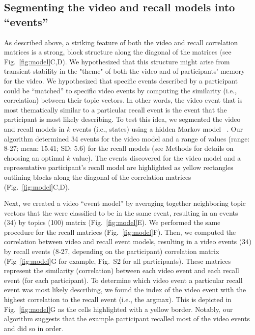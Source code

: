 \documentclass{article}
\begin{document}
\subsection*{Segmenting the video and recall models into ``events''}
As described above, a striking feature of both the video and recall correlation matrices is a strong, block structure along the diagonal of the matrices (see Fig.~\ref{fig:model}C,D).  We hypothesized that this structure might arise from transient stability in the "theme" of both the video and of participants' memory for the video. We hypothesized that specific events described by a participant could be ``matched'' to specific video events by computing the similarity (i.e., correlation) between their topic vectors. In other words, the video event that is most thematically similar to a particular recall event is the event that the participant is most likely describing. To test this idea, we segmented the video and recall models in $k$ events (i.e., states) using a hidden Markov model ~\citep{BaldEtal17}. Our algorithm determined 34 events for the video model and a range of values (range: 8-27; mean: 15.41; SD: 5.6) for the recall models (see Methods for details on choosing an optimal $k$ value).  The events discovered for the video model and a representative participant's recall model are highlighted as yellow rectangles outlining blocks along the diagonal of the correlation matrices (Fig.~\ref{fig:model}C,D).

Next, we created a video ``event model'' by averaging together neighboring topic vectors that the were classified to be in the same event, resulting in an events (34) by topics (100) matrix (Fig.~\ref{fig:model}E).  We performed the same procedure for the recall matrices (Fig.~\ref{fig:model}F). Then, we computed the correlation between video and recall event models, resulting in a video events (34) by recall events (8-27, depending on the participant) correlation matrix (Fig~\ref{fig:model}G for example, Fig.~S2 for all participants). These matrices represent the similarity (correlation) between each video event and each recall event (for each participant). To determine which video event a particular recall event was most likely describing, we found the index of the video event with the highest correlation to the recall event (i.e., the argmax).  This is depicted in Fig.~\ref{fig:model}G as the cells highlighted with a yellow border. Notably, our algorithm suggests that the example participant recalled most of the video events and did so in order.
\end{document}
